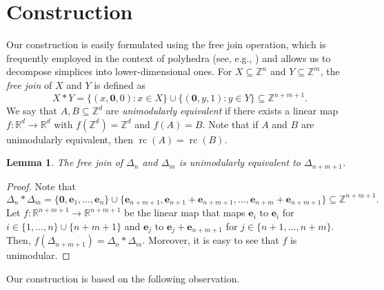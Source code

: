 \documentclass[11pt]{article}
\newcommand{\rc}{\operatorname{rc}}
\newcommand{\R}{\mathbb{R}}
\newcommand{\Z}{\mathbb{Z}}
\newcommand{\zero}{\mathbf{0}}
\newcommand{\unit}{\mathbf{e}}
\newtheorem{lemma}[theorem]{Lemma}
\begin{document}
\section{Construction}

Our construction is easily formulated using the free join operation, which is frequently employed in the context of polyhedra (see, e.g., \cite[\S 15.1.3]{henk2017basic}) and allows us to decompose simplices into lower-dimensional ones.
For $X \subseteq \Z^n$ and $Y \subseteq \Z^m$, the \emph{free join} of $X$ and $Y$ is defined as
\[
    X \ast Y = \{(x, \zero, 0): x \in X\} \cup \{(\zero, y, 1): y \in Y\} \subseteq \Z^{n+m+1}. 
\]
We say that $A,B \subseteq \Z^d$ are \emph{unimodularly equivalent} if there exists a linear map $f : \R^d \to \R^d$ with $f(\Z^d) = \Z^d$ and $f(A) = B$.
Note that if $A$ and $B$ are unimodularly equivalent, then $\rc(A) = \rc(B)$.

\begin{lemma}
    \label{lemFreeJoinSimplex}
    The free join of $\Delta_n$ and $\Delta_m$ is unimodularly equivalent to $\Delta_{n + m + 1}$.
\end{lemma}
\begin{proof}
    Note that
    \[
        \Delta_n \ast \Delta_m = \{\zero, \unit_1, \dots, \unit_n\} \cup \{\unit_{n+m+1}, \unit_{n+1} + \unit_{n+m+1}, \dots, \unit_{n+m} + \unit_{n+m+1}\} \subseteq{\Z^{n+m+1}}.
    \]
    Let $f : \R^{n+m+1} \to \R^{n+m+1}$ be the linear map that maps $\unit_i$ to $\unit_i$ for $i \in \{1,\dots,n\} \cup \{n+m+1\}$ and $\unit_j$ to $\unit_j + \unit_{n+m+1}$ for $j \in \{n+1, \dots, n+m\}$. Then, $f(\Delta_{n+m+1}) = \Delta_n \ast \Delta_m$. Moreover, it is easy to see that $f$ is unimodular.
\end{proof}

Our construction is based on the following observation.
\end{document}
